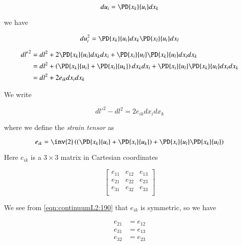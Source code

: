\begin{equation}\label{eqn:continuumL2:130}
du_i = \PD{x_k}{u_i} dx_k
\end{equation}

we have

\begin{equation}\label{eqn:continuumL2:150}
du_i^2 = 
\PD{x_k}{u_i} dx_k
\PD{x_l}{u_i} dx_l
\end{equation}

\begin{align*}
{dl'}^2 
&= 
dl^2 
+ 2 \PD{x_k}{u_i} dx_k dx_i 
+ \PD{x_i}{u_l} 
\PD{x_k}{u_l} 
dx_i dx_k \\
&= 
dl^2 
+ 
\left(
\PD{x_k}{u_i} 
+
\PD{x_i}{u_k} 
\right)
dx_k dx_i 
+ \PD{x_i}{u_l} 
\PD{x_k}{u_l} 
dx_i dx_k \\
&=
dl^2 
+ 
2 e_{ik} dx_i dx_k
\end{align*}

We write

\begin{equation}\label{eqn:continuumL2:170}
{dl'}^2 - dl^2 = 2 e_{ik} dx_i dx_k
\end{equation}

where we define the \emph{strain tensor} as

\begin{equation}\label{eqn:continuumL2:190}
e_{ik} = \inv{2} \left(
\left(
\PD{x_k}{u_i} 
+
\PD{x_i}{u_k} 
\right)
+ \PD{x_i}{u_l} 
\PD{x_k}{u_l} 
\right)
\end{equation}

Here $e_{ik}$ is a $3 \times 3$ matrix in Cartesian coordinates

\begin{equation}\label{eqn:continuumL2:210}
\begin{bmatrix}
e_{11} & e_{12} & e_{13} \\
e_{21} & e_{22} & e_{23} \\
e_{31} & e_{32} & e_{33} \\
\end{bmatrix}
\end{equation}

We see from \ref{eqn:continuumL2:190} that $e_{ik}$ is symmetric, so we have

\begin{align}\label{eqn:continuumL2:230}
e_{21} &= e_{12} \\
e_{31} &= e_{13} \\
e_{32} &= e_{23}
\end{align}

